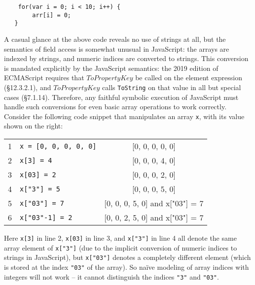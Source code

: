 \documentclass[sigplan,review,anonymous]{acmart}\settopmatter{printfolios=true,printccs=false,printacmref=false}
\begin{document}
\begin{center}
	\begin{minipage}{5cm}
		\begin{verbatim}
    for(var i = 0; i < 10; i++) {
        arr[i] = 0;
   }
		\end{verbatim}
	\end{minipage}
\end{center}



A casual glance at the above code reveals no use of strings at all, but the semantics of field access is somewhat unusual in JavaScript: the arrays are indexed by strings, and numeric indices are converted to strings. This conversion is mandated explicitly by the JavaScript semantics: the 2019 edition of ECMAScript \cite{ecmascript2019ecmascript} requires that $ToPropertyKey$ be called on the element expression (\S{12.3.2.1}), and $ToPropertyKey$ calls {\tt{ToString}} on that value in all but special cases (\S{7.1.14}). Therefore, any faithful symbolic execution of JavaScript must handle such conversions for even basic array operations to work correctly. Consider the following code snippet that manipulates an array \texttt{x}, with its value shown on the right:

\medskip
\hspace{-4mm}\begin{tabular}{l|l|c}
1&	{\tt{x = [0, 0, 0, 0, 0]}} & [0, 0, 0, 0, 0] \\
2&	{\tt{x[3] = 4}} & [0, 0, 0, 4, 0] \\
3&	{\tt{x[03] = 2}} & [0, 0, 0, 2, 0] \\
4&	{\tt{x["3"] = 5}} & [0, 0, 0, 5, 0] \\
5&	{\tt{x["03"] = 7}} & [0, 0, 0, 5, 0] and x["03"] = 7\\
6&	{\tt{x["03"-1] = 2}} & [0, 0, 2, 5, 0] and x["03"] = 7\\
\end{tabular}
\medskip

Here \texttt{x[3]} in line 2, \texttt{x[03]} in line 3, and \texttt{x["3"]} in line 4 all denote the same array element of \texttt{x["3"]} (due to the implicit conversion of numeric indices to strings in JavaScript), but \texttt{x["03"]} denotes a completely different element (which is stored at the index \texttt{"03"} of the array). So na\"ive modeling of array indices with integers will not work -- it cannot distinguish the indices \texttt{"3"} and \texttt{"03"}. 
\end{document}
